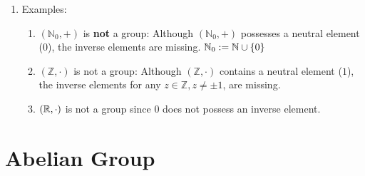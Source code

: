 \begin{enumerate}
    \item Examples:
    \begin{enumerate}
        \item $(\mathbb{N}_0, +)$ is \textbf{not} a group: Although $(\mathbb{N}_0, +)$ possesses a neutral element ($0$), the inverse elements are missing.
        \hfill $\mathbb{N}_0 := \mathbb{N} \cup \left\{0\right\}$
        \hfill \cite{mfml/book/mml/Deisenroth-Faisal-Ong}

        \item $(\mathbb{Z}, \cdot)$ is not a group: Although $(\mathbb{Z}, \cdot)$ contains a neutral element ($1$), the inverse elements for any $z \in \mathbb{Z}, z \neq \pm1$, are missing.
        \hfill \cite{mfml/book/mml/Deisenroth-Faisal-Ong}

        \item $(\mathbb{R}, \cdot)$ is not a group since $0$ does not possess an inverse element.
        \hfill \cite{mfml/book/mml/Deisenroth-Faisal-Ong}

        
    \end{enumerate}
\end{enumerate}






\section{Abelian Group}


